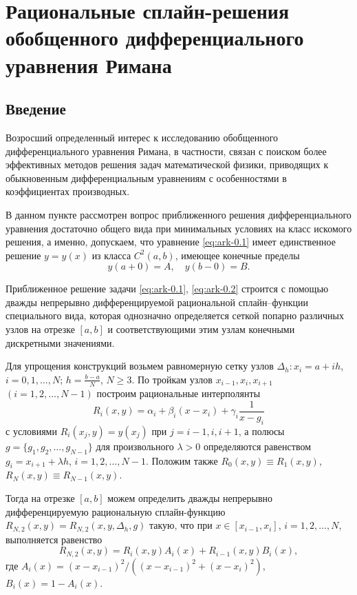 \section{Рациональные сплайн-решения обобщенного дифференциального уравнения Римана}

\subsection{Введение}

Возросший определенный интерес к исследованию обобщенного дифференциального уравнения
Римана, в частности, связан с поиском более эффективных методов решения задач
математической физики, приводящих к обыкновенным дифференциальным уравнениям
с особенностями в коэффициентах производных.

В данном пункте рассмотрен вопрос приближенного решения дифференциального уравнения
достаточно общего вида при минимальных условиях на класс искомого решения, а именно,
допускаем, что уравнение \eqref{eq:ark-0.1} имеет единственное решение
$y=y(x)$ из класса $C^2(a,b)$, имеющее конечные пределы
\begin{equation}\label{eq:ark-0.2}
y(a+0)=A,\quad y(b-0)=B.
\end{equation}

Приближенное решение задачи \eqref{eq:ark-0.1}, \eqref{eq:ark-0.2} строится с помощью дважды
 непрерывно дифференцируемой рациональной сплайн--функции специального вида,
 которая однозначно определяется сеткой попарно различных узлов на отрезке $[a,b]$ и
соответствующими этим узлам конечными дискретными значениями.

Для упрощения конструкций возьмем равномерную сетку узлов
$\Delta_h: x_i=a+ih$, $i=0,1,\dots,N$; $h=\frac{b-a}N$, $N\geqslant 3$.
По тройкам узлов $x_{i-1}, x_i, x_{i+1}$ $(i=1,2,\dots,N-1)$
построим \cite{bib:ark-11} рациональные интерполянты
\begin{equation}\label{eq:ark-0.3}
R_i(x,y)=\alpha_i+\beta_i(x-x_i)+\gamma_i\frac 1{x-g_i}
\end{equation}
с условиями $R_i(x_j,y)=y(x_j)$ при $j=i-1,i,i+1$, а полюсы
$g=\{g_1,g_2,\dots,g_{N-1}\}$ для произвольного $\lambda>0$ определяются
равенством $g_i=x_{i+1}+\lambda h$, $i=1,2,\dots,N-1.$ Положим также
$R_0(x,y)\equiv R_1(x,y)$, $R_N(x,y)\equiv R_{N-1}(x,y)$.

Тогда на отрезке $[a,b]$ можем определить \cite{bib:ark-12} дважды
непрерывно дифференцируемую рациональную сплайн-функцию
$R_{N,2}(x,y)=R_{N,2}(x,y,\Delta_h,g)$ такую, что при $x\in[x_{i-1}, x_i]$,
$i=1,2,\dots,N$, выполняется равенство
\begin{equation}\label{eq:ark-0.4}
R_{N,2}(x,y)=R_i(x,y)A_i(x)+R_{i-1}(x,y)B_i(x),
\end{equation}
где $A_i(x)=(x-x_{i-1})^2/((x-x_{i-1})^2+(x-x_i)^2)$, $B_i(x)=1-A_i(x)$.

